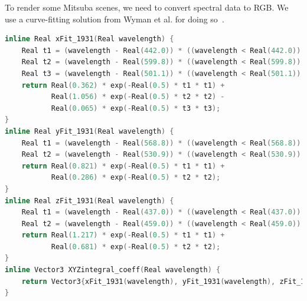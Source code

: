 To render some Mitsuba scenes, we need to convert spectral data to RGB. We use a curve-fitting solution from Wyman et al. for doing so~\cite{Wyman:2013:SAP}.
\begin{lstlisting}[language=c++]
inline Real xFit_1931(Real wavelength) {
    Real t1 = (wavelength - Real(442.0)) * ((wavelength < Real(442.0)) ? Real(0.0624) : Real(0.0374));
    Real t2 = (wavelength - Real(599.8)) * ((wavelength < Real(599.8)) ? Real(0.0264) : Real(0.0323));
    Real t3 = (wavelength - Real(501.1)) * ((wavelength < Real(501.1)) ? Real(0.0490) : Real(0.0382));
    return Real(0.362) * exp(-Real(0.5) * t1 * t1) + 
           Real(1.056) * exp(-Real(0.5) * t2 * t2) -
           Real(0.065) * exp(-Real(0.5) * t3 * t3);
}
inline Real yFit_1931(Real wavelength) {
    Real t1 = (wavelength - Real(568.8)) * ((wavelength < Real(568.8)) ? Real(0.0213) : Real(0.0247));
    Real t2 = (wavelength - Real(530.9)) * ((wavelength < Real(530.9)) ? Real(0.0613) : Real(0.0322));
    return Real(0.821) * exp(-Real(0.5) * t1 * t1) +
           Real(0.286) * exp(-Real(0.5) * t2 * t2);
}
inline Real zFit_1931(Real wavelength) {
    Real t1 = (wavelength - Real(437.0)) * ((wavelength < Real(437.0)) ? Real(0.0845) : Real(0.0278));
    Real t2 = (wavelength - Real(459.0)) * ((wavelength < Real(459.0)) ? Real(0.0385) : Real(0.0725));
    return Real(1.217) * exp(-Real(0.5) * t1 * t1) +
           Real(0.681) * exp(-Real(0.5) * t2 * t2);
}
inline Vector3 XYZintegral_coeff(Real wavelength) {
    return Vector3{xFit_1931(wavelength), yFit_1931(wavelength), zFit_1931(wavelength)};
}


\end{lstlisting}
